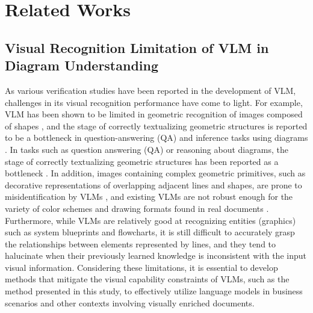 \section{Related Works}
\subsection{Visual Recognition Limitation of VLM in Diagram Understanding}
As various verification studies have been reported in the development of VLM, challenges in its visual recognition performance have come to light.
For example, VLM has been shown to be limited in geometric recognition of images composed of shapes \cite{kamoi_visonlyqa_2024, zhang_mathverse_2024, yue_mmmu_2024}, and the stage of correctly textualizing geometric structures is reported to be a bottleneck in question-answering (QA) and inference tasks using diagrams \cite{ye_beyond_2024}.
In tasks such as question answering (QA) or reasoning about diagrams, the stage of correctly textualizing geometric structures has been reported as a bottleneck \cite{ye_beyond_2024}.
In addition, images containing complex geometric primitives, such as decorative representations of overlapping adjacent lines and shapes, are prone to misidentification by VLMs \cite{rahmanzadehgervi_vision_2024}, and existing VLMs are not robust enough for the variety of color schemes and drawing formats found in real documents \cite{ye_beyond_2024, singh_flowvqa_2024, tannert_flowchartqa_2023}.
Furthermore, while VLMs are relatively good at recognizing entities (graphics) such as system blueprints and flowcharts, it is still difficult to accurately grasp the relationships between elements represented by lines\cite{giledereli_vision-language_2024}, and they tend to halucinate when their previously learned knowledge is inconsistent with the input visual information\cite{mukhopadhyay_unraveling_2024, giledereli_vision-language_2024}.
Considering these limitations, it is essential to develop methods that mitigate the visual capability constraints of VLMs, such as the method presented in this study, to effectively utilize language models in business scenarios and other contexts involving visually enriched documents.

